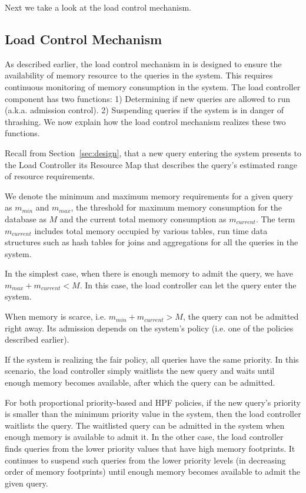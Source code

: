 Next we take a look at the load control mechanism. %
\subsection{Load Control Mechanism}\label{ssec:load-control-mech}
As described earlier, the load control mechanism in \sys{} is designed to ensure the availability of memory resource to the queries in the system.
This requires continuous monitoring of memory consumption in the system.
The load controller component has two functions:
1) Determining if new queries are allowed to run (a.k.a. admission control).
2) Suspending queries if the system is in danger of thrashing.
We now explain how the load control mechanism realizes these two functions.


Recall from Section~\ref{sec:design}, that a new query entering the system presents to the Load Controller its Resource Map that describes the query's estimated range of resource requirements.

We denote the minimum and maximum memory requirements for a given query as $m_{min}$ and $m_{max}$, the threshold for maximum memory consumption for the database as $M$ and the current total memory consumption as $m_{current}$. 
The term $m_{current}$ includes total memory occupied by various tables, run time data structures such as hash tables for joins and aggregations for all the queries in the system.

In the simplest case, when there is enough memory to admit the query, we have $m_{max} + m_{current} < M$. 
In this case, the load controller can let the query enter the system.

When memory is scarce, i.e. $m_{min}+m_{current}>M$, the query can not be admitted right away. 
Its admission depends on the system's policy (i.e. one of the policies described earlier).

If the system is realizing the fair policy, all queries have the same priority.
In this scenario, the load controller simply waitlists the new query and waits until enough memory becomes available, after which the query can be admitted.

For both proportional priority-based and HPF policies, if the new query's priority is smaller than the minimum priority value in the system, then the load controller waitlists the query. 
The waitlisted query can be admitted in the system when enough memory is available to admit it.
In the other case, the load controller finds queries from the lower priority values that have high memory footprints. 
It continues to suspend such queries from the lower priority levels (in decreasing order of memory footprints) until enough memory becomes available to admit the given query. 

